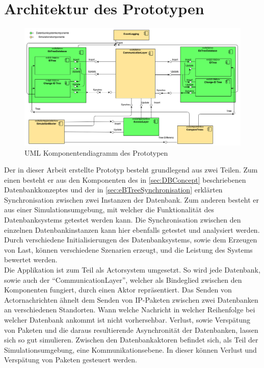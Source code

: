 \documentclass[a4paper,11pt,oneside,%
headsepline,												%
footsepline,												%
bibtotocnumbered									%
]{scrreprt}
\begin{document}
\section{Architektur des Prototypen}
\begin{figure}[h!]
  \begin{center}
    \includegraphics[width=1.0\linewidth]{bilder/prototyp_component_diagram.png}
  \end{center}
 \caption{UML Komponentendiagramm des Prototypen}
\end{figure}
Der in dieser Arbeit erstellte Prototyp besteht grundlegend aus zwei Teilen. Zum einen besteht er aus den Komponenten des in \autoref{sec:DBConcept} beschriebenen Datenbankkonzeptes und der in \autoref{sec:eBTreeSynchronisation} erklärten Synchronisation zwischen zwei Instanzen der Datenbank. Zum anderen besteht er aus einer Simulationsumgebung, mit welcher die Funktionalität des Datenbanksystems getestet werden kann. Die Synchronisation zwischen den einzelnen Datenbankinstanzen kann hier ebenfalls getestet und analysiert werden. Durch verschiedene Initialisierungen des Datenbanksystems, sowie dem Erzeugen von Last, können verschiedene Szenarien erzeugt, und die Leistung des Systems bewertet werden. \\
Die Applikation ist zum Teil als Actorsystem umgesetzt. So wird jede Datenbank, sowie auch der \enquote{CommunicationLayer}, welcher als Bindeglied zwischen den Komponenten fungiert, durch einen Aktor repräsentiert.
Das Senden von Actornachrichten ähnelt dem Senden von IP-Paketen zwischen zwei Datenbanken an verschiedenen Standorten. Wann welche Nachricht in welcher Reihenfolge bei welcher Datenbank ankommt ist nicht vorhersehbar. Verlust, sowie Verspätung von Paketen und die daraus resultierende Asynchronität der Datenbanken, lassen sich so gut simulieren.
Zwischen den Datenbankaktoren befindet sich, als Teil der Simulationsumgebung, eine Kommunikationsebene. In dieser können Verlust und Verspätung von Paketen gesteuert werden.
\end{document}
